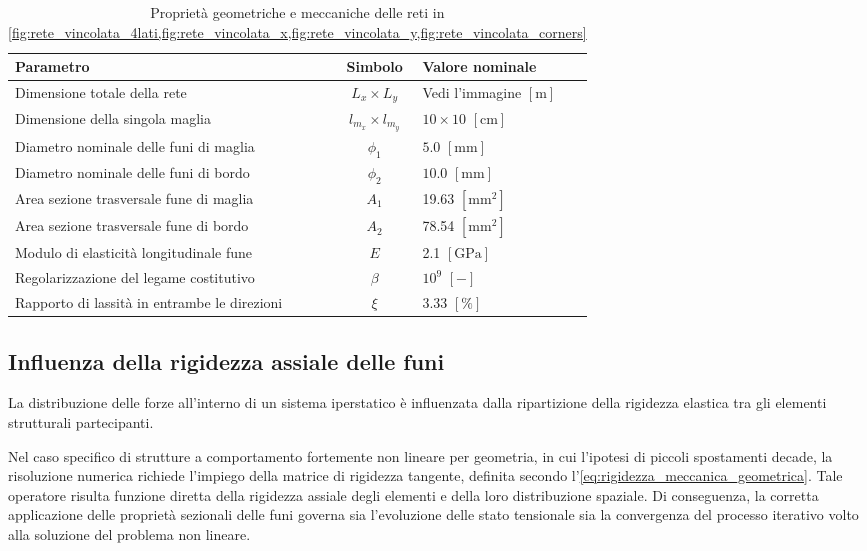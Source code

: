 \begin{table}[htbp]
    \centering
    \caption{Proprietà geometriche e meccaniche delle reti in \cref{fig:rete_vincolata_4lati,fig:rete_vincolata_x,fig:rete_vincolata_y,fig:rete_vincolata_corners}}
    \vspace{5pt}
    \label{tab:caratteristiche_vincoli_rete}
    \begin{tabularx}{\textwidth}{l c X}
        \hline
        \textbf{Parametro} & \textbf{Simbolo} & \textbf{Valore nominale} \\ \hline
        Dimensione totale della rete & $L_x \times L_y$ & Vedi l'immagine $[\text{m}]$ \\
        Dimensione della singola maglia & $l_{m_x} \times l_{m_y}$ & $10 \times 10$ $[\text{cm}]$ \\
        Diametro nominale delle funi di maglia & $\phi_1$ & $5.0$ $[\text{mm}]$ \\
        Diametro nominale delle funi di bordo & $\phi_2$ & $10.0$ $[\text{mm}]$ \\
        Area sezione trasversale fune di maglia & $A_1$ & 19.63 $[\text{mm}^2]$ \\
        Area sezione trasversale fune di bordo & $A_2$ & 78.54 $[\text{mm}^2]$ \\
        Modulo di elasticità longitudinale fune & $E$ & 2.1 $[\text{GPa}]$ \\
        Regolarizzazione del legame costitutivo & $\beta$ & $10^{9}$ $[-]$\\       
        Rapporto di lassità in entrambe le direzioni & $\xi$& 3.33 $[\text{\%}]$\\ \hline
    \end{tabularx}
\end{table}

\subsection{Influenza della rigidezza assiale delle funi}
La distribuzione delle forze all'interno di un sistema iperstatico è influenzata dalla ripartizione della rigidezza elastica tra gli elementi strutturali partecipanti. 

Nel caso specifico di strutture a comportamento fortemente non lineare per geometria, in cui l'ipotesi di piccoli spostamenti decade, la risoluzione numerica richiede l'impiego della matrice di rigidezza tangente, definita secondo l'\cref{eq:rigidezza_meccanica_geometrica}. Tale operatore risulta funzione diretta della rigidezza assiale degli elementi e della loro distribuzione spaziale. Di conseguenza, la corretta applicazione delle proprietà sezionali delle funi governa sia l'evoluzione delle stato tensionale sia la convergenza del processo iterativo volto alla soluzione del problema non lineare. 

